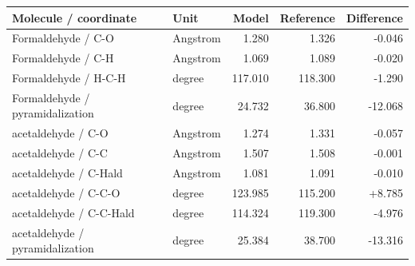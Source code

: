\begin{tabular}{llrrr}\toprule
Molecule / coordinate & Unit & Model & Reference & Difference\\\midrule
Formaldehyde / C-O & Angstrom & 1.280 & 1.326 & -0.046\\
Formaldehyde / C-H & Angstrom & 1.069 & 1.089 & -0.020\\
Formaldehyde / H-C-H & degree & 117.010 & 118.300 & -1.290\\
Formaldehyde / pyramidalization & degree & 24.732 & 36.800 & -12.068\\
acetaldehyde / C-O & Angstrom & 1.274 & 1.331 & -0.057\\
acetaldehyde / C-C & Angstrom & 1.507 & 1.508 & -0.001\\
acetaldehyde / C-Hald & Angstrom & 1.081 & 1.091 & -0.010\\
acetaldehyde / C-C-O & degree & 123.985 & 115.200 & +8.785\\
acetaldehyde / C-C-Hald & degree & 114.324 & 119.300 & -4.976\\
acetaldehyde / pyramidalization & degree & 25.384 & 38.700 & -13.316\\
\bottomrule\end{tabular}
